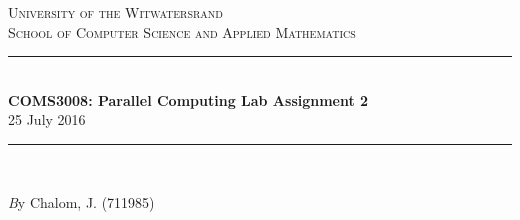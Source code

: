 \documentclass[11pt]{article}
\begin{document}
\begin{page}

\newcommand{\HRule}{\rule{\linewidth}{0.3mm}} %
\renewcommand\section{\@startsection{section}{1}{\z@}%
                                  {-3.5ex \@plus -1ex \@minus -.2ex}%
                                  {2.3ex \@plus.2ex}%
                                  {\normalfont\large\bfseries}}
\setlength{\parindent}{0pt}

\center %
 

\textsc{\LARGE University of the Witwatersrand}\\[1.5cm] %
\textsc{\Large School of Computer Science and Applied Mathematics}\\[0.5cm] %


\HRule \\[0.4cm]
{ \huge \bfseries COMS3008: Parallel Computing Lab Assignment 2}\\[0.4cm] %
  \large 25 July 2016
\HRule \\[1.5cm]
 
\begin{minipage}{1\textwidth}
	\Large \emph By Chalom, J. (711985)\\
\end{minipage}


\vfill %

\end{page}
\end{document}
